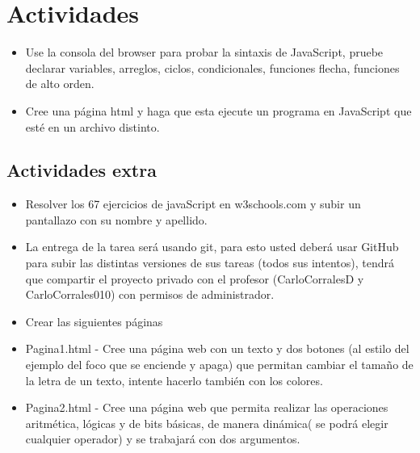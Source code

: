 \documentclass{article}
\begin{document}
\section{Actividades}
	\begin{itemize}		
		\item Use la consola del browser para probar la sintaxis de JavaScript, pruebe declarar variables, arreglos, ciclos, condicionales, funciones flecha, funciones de alto orden.
		\item Cree una página  html y haga que esta ejecute un programa en JavaScript que esté en un archivo distinto.
	\end{itemize}
	\subsection{Actividades extra}
		\begin{itemize}		
			\item Resolver los 67 ejercicios de javaScript en w3schools.com y subir un pantallazo con su nombre y apellido.
			\item La entrega de la tarea será usando git, para esto usted deberá usar GitHub para subir las distintas versiones de sus tareas (todos sus intentos), tendrá que compartir el proyecto privado con el profesor (CarloCorralesD y CarloCorrales010) con permisos de administrador.
			\item Crear las siguientes páginas
			\item Pagina1.html - Cree una página web con un texto y dos botones (al estilo del ejemplo del foco que se enciende y apaga) que permitan cambiar el tamaño de la letra de un texto, intente hacerlo también con los colores.
			\item Pagina2.html - Cree una página web que permita realizar las operaciones aritmética, lógicas y de bits básicas, de manera dinámica( se podrá elegir cualquier operador) y se trabajará con dos argumentos.
		\end{itemize}
\end{document}
